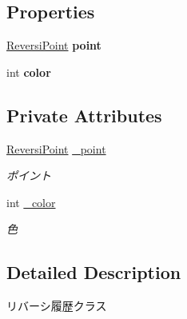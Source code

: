 \subsection*{Properties}
\begin{DoxyCompactItemize}
\item 
\mbox{\label{class_reversi_wpf_1_1_reversi_history_a77e0bae10a8ede480d3878cc2e50c220}} 
\hyperlink{class_reversi_wpf_1_1_reversi_point}{Reversi\+Point} {\bfseries point}
\item 
\mbox{\label{class_reversi_wpf_1_1_reversi_history_af1c6b73c5582a45d2b3f637e08e36fc0}} 
int {\bfseries color}
\end{DoxyCompactItemize}
\subsection*{Private Attributes}
\begin{DoxyCompactItemize}
\item 
\mbox{\label{class_reversi_wpf_1_1_reversi_history_a5719867d6f595c60057324225f02935e}} 
\hyperlink{class_reversi_wpf_1_1_reversi_point}{Reversi\+Point} \hyperlink{class_reversi_wpf_1_1_reversi_history_a5719867d6f595c60057324225f02935e}{\+\_\+point}
\begin{DoxyCompactList}\small\item\em ポイント \end{DoxyCompactList}\item 
\mbox{\label{class_reversi_wpf_1_1_reversi_history_a0aaebc98050885c7b1b67da208dc8ff1}} 
int \hyperlink{class_reversi_wpf_1_1_reversi_history_a0aaebc98050885c7b1b67da208dc8ff1}{\+\_\+color}
\begin{DoxyCompactList}\small\item\em 色 \end{DoxyCompactList}\end{DoxyCompactItemize}


\subsection{Detailed Description}
リバーシ履歴クラス 

